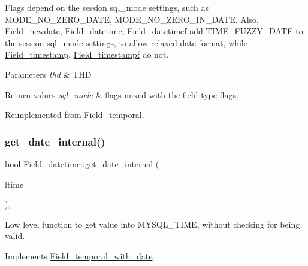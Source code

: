 Flags depend on the session sql\+\_\+mode settings, such as M\+O\+D\+E\+\_\+\+N\+O\+\_\+\+Z\+E\+R\+O\+\_\+\+D\+A\+TE, M\+O\+D\+E\+\_\+\+N\+O\+\_\+\+Z\+E\+R\+O\+\_\+\+I\+N\+\_\+\+D\+A\+TE. Also, \mbox{\hyperlink{classField__newdate}{Field\+\_\+newdate}}, \mbox{\hyperlink{classField__datetime}{Field\+\_\+datetime}}, \mbox{\hyperlink{classField__datetimef}{Field\+\_\+datetimef}} add T\+I\+M\+E\+\_\+\+F\+U\+Z\+Z\+Y\+\_\+\+D\+A\+TE to the session sql\+\_\+mode settings, to allow relaxed date format, while \mbox{\hyperlink{classField__timestamp}{Field\+\_\+timestamp}}, \mbox{\hyperlink{classField__timestampf}{Field\+\_\+timestampf}} do not.


\begin{DoxyParams}{Parameters}
{\em thd} & T\+HD \\
\hline
\end{DoxyParams}

\begin{DoxyRetVals}{Return values}
{\em sql\+\_\+mode} & flags mixed with the field type flags. \\
\hline
\end{DoxyRetVals}


Reimplemented from \mbox{\hyperlink{classField__temporal_ac97041d80803a32c6fb9250bfa0c9200}{Field\+\_\+temporal}}.

\mbox{\label{classField__datetime_ad1b048032be351ce7227d8ab6804fc99}} 
\subsubsection{\texorpdfstring{get\+\_\+date\+\_\+internal()}{get\_date\_internal()}}
{\footnotesize\ttfamily bool Field\+\_\+datetime\+::get\+\_\+date\+\_\+internal (\begin{DoxyParamCaption}\item[{M\+Y\+S\+Q\+L\+\_\+\+T\+I\+ME $\ast$}]{ltime }\end{DoxyParamCaption})\hspace{0.3cm}{\ttfamily [protected]}, {\ttfamily [virtual]}}

Low level function to get value into M\+Y\+S\+Q\+L\+\_\+\+T\+I\+ME, without checking for being valid. 

Implements \mbox{\hyperlink{classField__temporal__with__date_aef905f77b5430dd2b3ef461ce916b4ef}{Field\+\_\+temporal\+\_\+with\+\_\+date}}.


